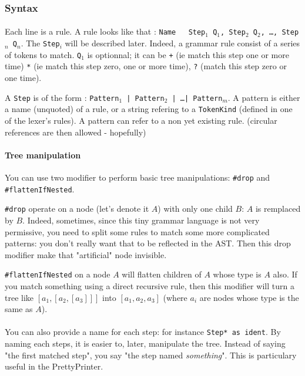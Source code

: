 \documentclass{article}
\newcommand\cc[1]{\texttt{#1}}
\begin{document}
			\subsubsection{Syntax}
				\paragraph{} Each line is a rule. A rule looks like that : \cc{Name~~~Step$_1$ Q$_1$, Step$_2$ Q$_2$, \dots, Step$_n$ Q$_n$}. The \cc{Step$_i$} will be described later. Indeed, a grammar rule consist of a series of tokens to match. \cc{Q$_1$} is optionnal; it can be \cc{+} (ie match this step one or more time) \cc{*} (ie match this step zero, one or more time), \cc{?} (match this step zero or one time).
				
				A \cc{Step} is of the form : \cc{Pattern$_1$ | Pattern$_2$ | \dots | Pattern$_m$}. A pattern is either a name (unquoted) of a rule, or a string refering to a \cc{TokenKind} (defined in one of the lexer's rules). A pattern can refer to a non yet existing rule. (circular references are then allowed - hopefully)


				\paragraph{Tree manipulation} You can use two modifier to perform basic tree manipulations: \cc{\#drop} and \cc{\#flattenIfNested}. 

				\cc{\#drop} operate on a node (let's denote it $A$) with only one child $B$: $A$ is remplaced by $B$. Indeed, sometimes, since this tiny grammar language is not very permissive, you need to split some rules to match some more complicated patterns: you don't really want that to be reflected in the AST. Then this drop modifier make that "artificial" node invisible.

				\cc{\#flattenIfNested} on a node $A$ will flatten children of $A$ whose type is $A$ also. If you match something using a direct recursive rule, then this modifier will turn a tree like $[a_1, [a_2, [a_3]]]$ into $[a_1, a_2, a_3]$ (where $a_i$ are nodes whose type is the same as $A$).

				\paragraph{} You can also provide a name for each step: for instance \cc{Step* as ident}. By naming each steps, it is easier to, later, manipulate the tree. Instead of saying "the first matched step", you say "the step named \textit{something}". This is particulary useful in the PrettyPrinter.
\end{document}
